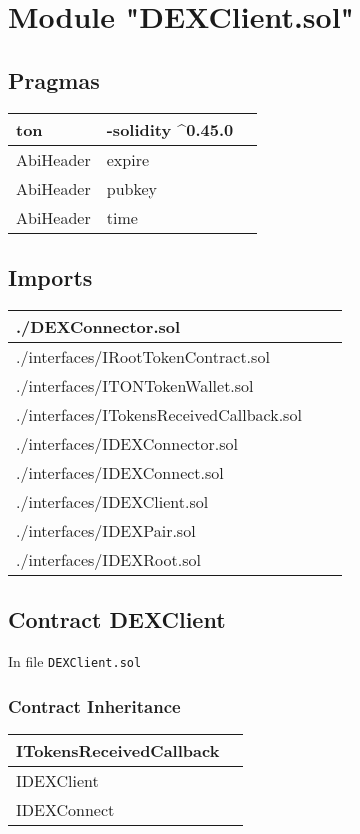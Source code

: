 
\section{Module "DEXClient.sol"}


\subsection{Pragmas}


\noindent\begin{tabular}{|l|l|p{5cm}|}\hline
ton & -solidity \^{}0.45.0 &\\\hline
AbiHeader &  expire &\\\hline
AbiHeader &  pubkey &\\\hline
AbiHeader &  time &\\\hline
\end{tabular}


\subsection{Imports}


\noindent\begin{tabular}{|l|l|p{5cm}|}\hline
./DEXConnector.sol &\\\hline
./interfaces/IRootTokenContract.sol &\\\hline
./interfaces/ITONTokenWallet.sol &\\\hline
./interfaces/ITokensReceivedCallback.sol &\\\hline
./interfaces/IDEXConnector.sol &\\\hline
./interfaces/IDEXConnect.sol &\\\hline
./interfaces/IDEXClient.sol &\\\hline
./interfaces/IDEXPair.sol &\\\hline
./interfaces/IDEXRoot.sol &\\\hline
\end{tabular}


\subsection{Contract DEXClient}


In file {\tt DEXClient.sol}

\subsubsection{Contract Inheritance}


\noindent\begin{tabular}{|l|p{5cm}|}\hline
ITokensReceivedCallback & \\\hline
IDEXClient & \\\hline
IDEXConnect & \\\hline
\end{tabular}


